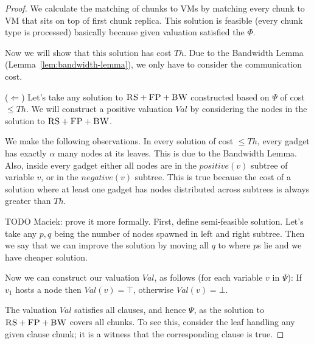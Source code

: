 \documentclass[9pt,twocolumn]{scrartcl}
\newcommand{\clauses}{\alpha}
\newcommand{\FP}{\textsc{FP}}
\newcommand{\RS}{\textsc{RS}}
\newcommand{\BW}{\textsc{BW}}
\newcommand{\Formula}{\ensuremath{\Psi}}
\newcommand{\Thr}{\ensuremath{Th}}
\newcommand{\positive}{\ensuremath{positive}}
\newcommand{\negative}{\ensuremath{negative}}
\newcommand{\Val}{\ensuremath{Val}}
\begin{document}
\begin{appendix}
\begin{proof}
We calculate the matching of chunks to VMs by matching every chunk to
VM that sits on top of first chunk replica. This solution is feasible
(every chunk type is processed) basically
because given valuation satisfied the $\Phi$.

Now we will show that this solution has cost $\Thr$. 
Due to the Bandwidth Lemma (Lemma~\ref{lem:bandwidth-lemma}),
we only have to consider the communication cost. 

($\Leftarrow$) Let's take any solution to $\RS+\FP+\BW$ constructed based on $\Formula$ of cost $\leq \Thr$. 
We will construct a positive valuation $\Val$ by considering the nodes in
the solution to $\RS+\FP+\BW$.

We make the following observations. In every solution of cost
$\leq \Thr$, every gadget has exactly $\clauses$ many nodes 
at its leaves. This is due to the Bandwidth Lemma. Also, inside
every gadget either all nodes are in the $\positive(v)$ subtree
of variable $v$, or in the $\negative(v)$ subtree. This is true 
because the cost of a solution where at least one gadget has nodes
distributed across subtrees is
always greater than $\Thr$.

TODO Maciek: prove it more formally. First, define semi-feasible solution. Let's take any $p,q$ being the number of nodes
spawned in left and right subtree. Then we say that we can improve the
solution by moving all $q$ to where $p$s lie and we have cheaper solution.

Now we can construct our valuation $\Val$, as follows 
(for each variable $v$ in $\Formula$):
If $v_1$ hosts a node then $\Val(v) = \top$, 
otherwise $\Val(v) = \bot$.

The valuation $\Val$ satisfies all clauses, and hence $\Formula$,
as the solution to $\RS+\FP+\BW$ covers all chunks. To see this,
consider the leaf handling any given clause chunk;
it is a witness that the corresponding clause is true.
\end{proof}


\end{appendix}
\end{document}
